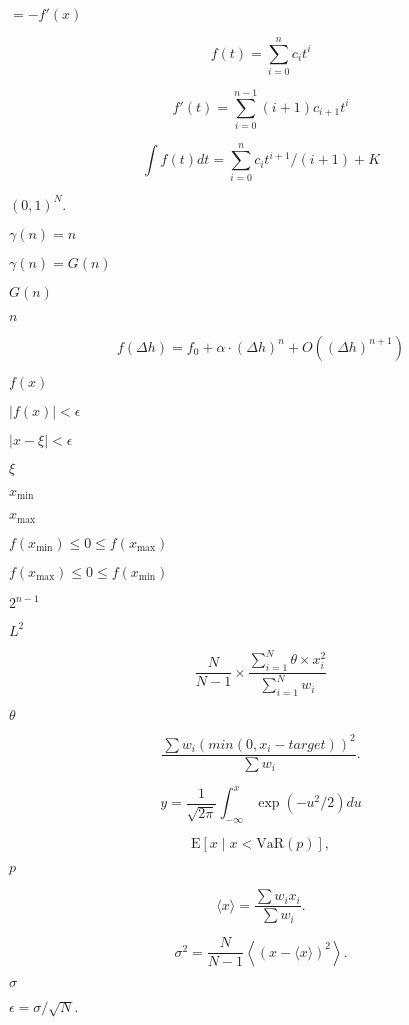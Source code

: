 \documentclass{article}
\begin{document}
$ = - f'(x) $
\pagebreak

\[ f(t) = \sum_{i=0}^n{c_i t^i} \]
\pagebreak

\[ f'(t) = \sum_{i=0}^{n-1}{(i+1) c_{i+1} t^i} \]
\pagebreak

\[ \int f(t)dt = \sum_{i=0}^n{c_i t^{i+1} / (i+1)} + K \]
\pagebreak

$ (0, 1)^N. $
\pagebreak

$\gamma(n) = n$
\pagebreak

$\gamma(n) = G(n)$
\pagebreak

$G(n)$
\pagebreak

$n$
\pagebreak

\[    f(\Delta h) = f_0 + \alpha\cdot (\Delta h)^n + O((\Delta h)^{n+1})
\]
\pagebreak

$ f(x) $
\pagebreak

$ |f(x)| < \epsilon
$
\pagebreak

$ |x-\xi| < \epsilon $
\pagebreak

$ \xi $
\pagebreak

$ x_\mathrm{min} $
\pagebreak

$ x_\mathrm{max} $
\pagebreak

$ f(x_\mathrm{min})
\leq 0 \leq f(x_\mathrm{max}) $
\pagebreak

$f(x_\mathrm{max}) \leq 0 \leq f(x_\mathrm{min}) $
\pagebreak

$ 2^{n-1} $
\pagebreak

$ L^2 $
\pagebreak

\[ \frac{N}{N-1} \times \frac{ \sum_{i=1}^{N}
    \theta \times x_i^{2}}{ \sum_{i=1}^{N} w_i} \]
\pagebreak

$ \theta $
\pagebreak

\[ \frac{\sum w_i (min(0, x_i-target))^2 }{\sum w_i}. \]
\pagebreak

\[ y = \frac{1}{\sqrt{2 \pi}}
                          \int_{-\infty}^{x} \exp (-u^2/2) du \]
\pagebreak

\[ \mathrm{E}\left[ x \;|\; x < \mathrm{VaR}(p) \right], \]
\pagebreak

$ p $
\pagebreak

\[ \langle x \rangle = \frac{\sum w_i x_i}{\sum w_i}. \]
\pagebreak

\[ \sigma^2 = \frac{N}{N-1} \left\langle \left(
    x-\langle x \rangle \right)^2 \right\rangle. \]
\pagebreak

$ \sigma $
\pagebreak

$ \epsilon = \sigma/\sqrt{N}. $
\pagebreak
\end{document}
